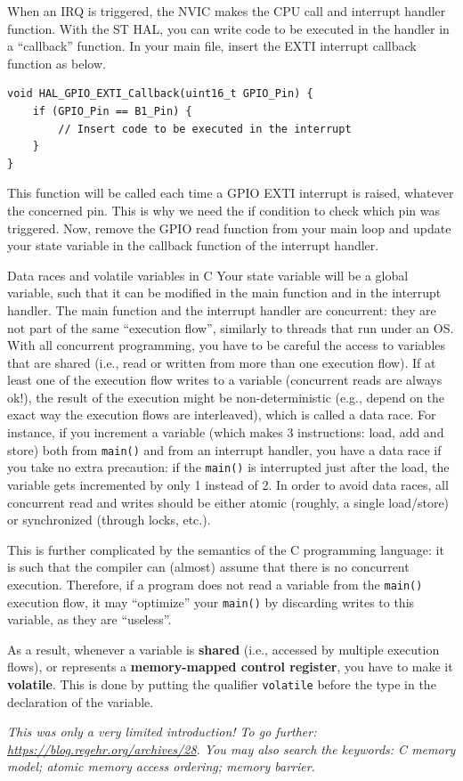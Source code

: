 When an IRQ is triggered, the NVIC makes the CPU call and interrupt handler function. With the ST HAL, you can write code to be executed in the handler in a ``callback'' function. In your main file, insert the EXTI interrupt callback function as below.

\begin{lstlisting}[columns=fullflexible]
void HAL_GPIO_EXTI_Callback(uint16_t GPIO_Pin) {
    if (GPIO_Pin == B1_Pin) {
        // Insert code to be executed in the interrupt
    }
}
\end{lstlisting}
This function will be called each time a GPIO EXTI interrupt is raised, whatever the concerned pin. This is why we need the if condition to check which pin was triggered. Now, remove the GPIO read function from your main loop and update your state variable in the callback function of the interrupt handler.

\begin{bclogo}[couleur = gray!20, arrondi = 0.2, logo=\bcattention]{Data races and volatile variables in C}
Your state variable will be a global variable, such that it can be modified in the main function and in the interrupt handler.
The main function and the interrupt handler are concurrent: they are not part of the same ``execution flow'', similarly to threads that run under an OS.
With all concurrent programming, you have to be careful the access to variables that are shared (i.e., read or written from more than one execution flow).
If at least one of the execution flow writes to a variable (concurrent reads are always ok!), the result of the execution might be non-deterministic (e.g., depend on the exact way the execution flows are interleaved), which is called a data race.
For instance, if you increment a variable (which makes 3 instructions: load, add and store) both from \texttt{main()} and from an interrupt handler, you have a data race if you take no extra precaution: if the \texttt{main()} is interrupted just after the load, the variable gets incremented by only 1 instead of 2.
In order to avoid data races, all concurrent read and writes should be either atomic (roughly, a single load/store) or synchronized (through locks, etc.).

This is further complicated by the semantics of the C programming language: it is such that the compiler can (almost) assume that there is no concurrent execution.
Therefore, if a program does not read a variable from the \texttt{main()} execution flow, it may ``optimize'' your \texttt{main()} by discarding writes to this variable, as they are ``useless''.

As a result, whenever a variable is \textbf{shared} (i.e., accessed by multiple execution flows), or represents a \textbf{memory-mapped control register}, you have to make it \textbf{volatile}. This is done by putting the qualifier \texttt{volatile} before the type in the declaration of the variable.

\textit{This was only a very limited introduction! To go further: \url{https://blog.regehr.org/archives/28}. You may also search the keywords: C memory model; atomic memory access ordering; memory barrier.}
\end{bclogo}

